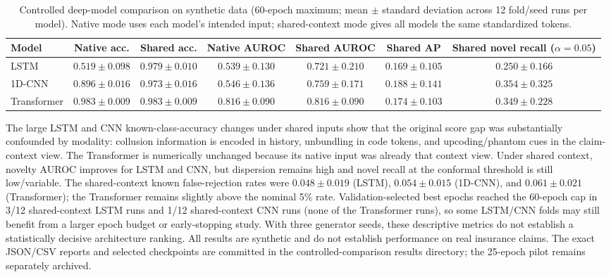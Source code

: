 \documentclass[conference]{IEEEtran}
\begin{document}
\begin{table}[t]
\caption{Controlled deep-model comparison on synthetic data (60-epoch maximum; mean $\pm$ standard deviation across 12 fold/seed runs per model). Native mode uses each model's intended input; shared-context mode gives all models the same standardized tokens.}
\label{tab:controlled}
\centering
\small
\begin{tabular}{lcccccc}
\toprule
Model & Native acc. & Shared acc. & Native AUROC & Shared AUROC & Shared AP & Shared novel recall ($\alpha=0.05$)\\
\midrule
LSTM & $0.519\pm0.098$ & $0.979\pm0.010$ & $0.539\pm0.130$ & $0.721\pm0.210$ & $0.169\pm0.105$ & $0.250\pm0.166$\\
1D-CNN & $0.896\pm0.016$ & $0.973\pm0.016$ & $0.546\pm0.136$ & $0.759\pm0.171$ & $0.188\pm0.141$ & $0.354\pm0.325$\\
Transformer & $0.983\pm0.009$ & $0.983\pm0.009$ & $0.816\pm0.090$ & $0.816\pm0.090$ & $0.174\pm0.103$ & $0.349\pm0.228$\\
\bottomrule
\end{tabular}
\end{table}

The large LSTM and CNN known-class-accuracy changes under shared inputs show that the original score gap was substantially confounded by modality: collusion information is encoded in history, unbundling in code tokens, and upcoding/phantom cues in the claim-context view. The Transformer is numerically unchanged because its native input was already that context view. Under shared context, novelty AUROC improves for LSTM and CNN, but dispersion remains high and novel recall at the conformal threshold is still low/variable. The shared-context known false-rejection rates were $0.048\pm0.019$ (LSTM), $0.054\pm0.015$ (1D-CNN), and $0.061\pm0.021$ (Transformer); the Transformer remains slightly above the nominal 5\% rate. Validation-selected best epochs reached the 60-epoch cap in 3/12 shared-context LSTM runs and 1/12 shared-context CNN runs (none of the Transformer runs), so some LSTM/CNN folds may still benefit from a larger epoch budget or early-stopping study. With three generator seeds, these descriptive metrics do not establish a statistically decisive architecture ranking. All results are synthetic and do not establish performance on real insurance claims. The exact JSON/CSV reports and selected checkpoints are committed in the controlled-comparison results directory; the 25-epoch pilot remains separately archived.
\end{document}

